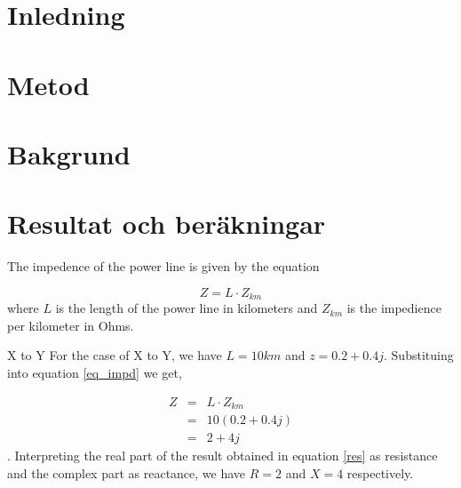 \documentclass{report}
\title{}
\date{\today}
\author{Johanna Sörbom}
\begin{document}
\maketitle
\section{Inledning}
\section{Metod}
\section{Bakgrund}
\section{Resultat och beräkningar}
The impedence of the power line is given by the equation 

\begin{equation}\label{eq_impd}
Z =  L \cdot Z_{km}
\end{equation} where $L$ is the length of the power line in kilometers and $Z_{km}$ is the impedience per kilometer in Ohms.

\begin{subsection}{X to Y}
For the case of X to Y, we have $L=10km$ and $z=0.2+0.4j$. Substituing into equation \ref{eq_impd} we get,

\begin{eqnarray}
Z&=&  L \cdot Z_{km} \\
&=&10 (0.2+0.4j) \\
&=& 2 + 4j \label{res}
\end{eqnarray}. Interpreting the real part of the result obtained in equation \ref{res} as resistance and the complex part as reactance, we have $R=2$ and $X=4$ respectively.



\end{subsection}
\end{document}
